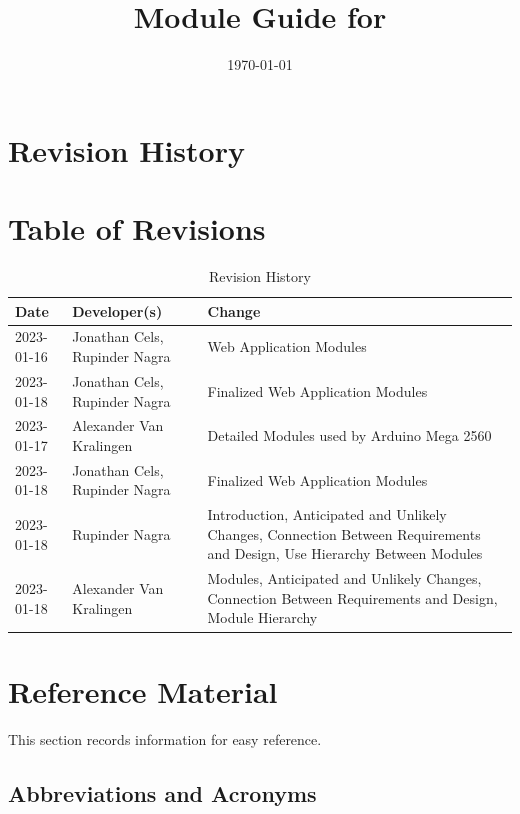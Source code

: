 \documentclass[12pt, titlepage]{article}
\begin{document}
\title{Module Guide for \progname{}} 
\author{\authname}
\date{\today}

\maketitle


\section{Revision History}

\section*{Table of Revisions}
\begin{table}[hp]
\caption{Revision History} \label{TblRevisionHistory}
\begin{tabularx}{\textwidth}{llX}
\toprule
\textbf{Date} & \textbf{Developer(s)} & \textbf{Change}\\
\midrule
2023-01-16 & Jonathan Cels, Rupinder Nagra & Web Application Modules\\
2023-01-18 & Jonathan Cels, Rupinder Nagra & Finalized Web Application Modules\\
2023-01-17 & Alexander Van Kralingen & Detailed Modules used by Arduino Mega 2560\\
2023-01-18 & Jonathan Cels, Rupinder Nagra & Finalized Web Application Modules\\
2023-01-18 & Rupinder Nagra & Introduction, Anticipated and Unlikely Changes, Connection Between Requirements and Design, Use Hierarchy Between Modules\\
2023-01-18 & Alexander Van Kralingen & Modules, Anticipated and Unlikely Changes, Connection Between Requirements and Design, Module Hierarchy\\
\bottomrule
\end{tabularx}
\end{table}

\newpage

\section{Reference Material}

This section records information for easy reference.

\subsection{Abbreviations and Acronyms}
\end{document}
